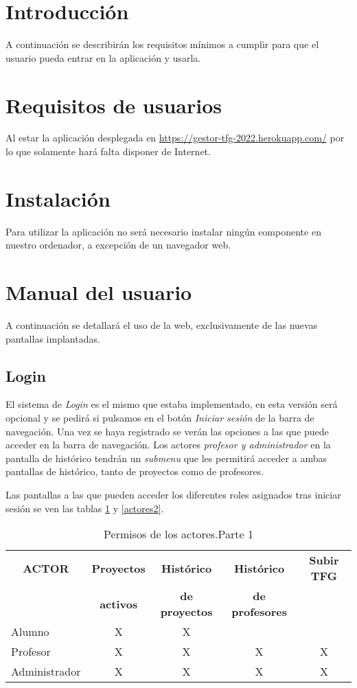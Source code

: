 
\section{Introducción}
A continuación se describirán los requisitos mínimos a cumplir para que el usuario pueda entrar en la aplicación y usarla.

\section{Requisitos de usuarios}
 Al estar la aplicación desplegada en \href{https://gestor-tfg-2022.herokuapp.com/}{https://gestor-tfg-2022.herokuapp.com/} por lo que solamente hará falta disponer de Internet.
\section{Instalación}
Para utilizar la aplicación no será necesario instalar ningún componente en nuestro ordenador, a excepción de un navegador web.
\section{Manual del usuario}
A continuación se detallará el uso de la web, exclusivamente de las nuevas pantallas implantadas.
\subsection{Login}
El sistema de \emph{Login} es el mismo que estaba implementado, en esta versión será opcional y se pedirá si pulsamos en el botón \emph{Iniciar sesión} de la barra de navegación. Una vez se haya registrado se verán las opciones a las que puede acceder en la barra de navegación. Los actores \emph{profesor y administrador} en la pantalla de histórico tendrán un \emph{submenu} que les permitirá acceder a ambas pantallas de histórico, tanto de proyectos como de profesores.

Las pantallas a las que pueden acceder los diferentes roles asignados tras iniciar sesión se ven las tablas
\ref{actores} y \ref{actores2}.
 
 \begin{table}[]
 	\label{actores}
 	\centering
 	\begin{tabular}{|l|c|c|c|c|}
 		\hline
 		\multicolumn{1}{|c|}{\textbf{ACTOR}}     & \textbf{Proyectos} & \textbf{Histórico} & \textbf{Histórico} & \textbf{Subir TFG} \\
 		\multicolumn{1}{|c|}{}     & \textbf{activos} & \textbf{de proyectos} & \textbf{de profesores} & {}  \\ \hline 
 		Alumno & X & X & {} & {} \\ \hline
 		Profesor  & X & X & X & X   \\ \hline
 		Administrador   & X & X & X & X   \\ \hline
 	\end{tabular}
 	\caption{Permisos de los actores.Parte 1}
 \end{table}

